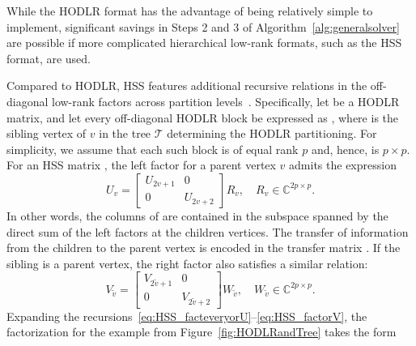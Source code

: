 \documentclass[final,reqno,onefignum,onetabnum]{siamart190516}
\begin{document}
While the HODLR format has the advantage of being relatively simple to implement, significant savings in Steps 2 and 3 of Algorithm~\ref{alg:generalsolver} are possible if  more complicated hierarchical low-rank formats, such as the HSS format, are used. 

Compared to HODLR, HSS features additional recursive relations in the off-diagonal low-rank factors across partition levels~\cite{bebendorf2008hierarchical,hackbusch2015hierarchical, martinsson2011fast}. 
Specifically, let   be a HODLR matrix, and let every off-diagonal HODLR block 
be expressed as , where  is the sibling vertex of $v$ in the tree $\mathcal T$ determining the HODLR partitioning. For simplicity, we assume that each such block is of equal rank $p$ and, hence,  is $p \times p$. 
For an HSS matrix , the left factor  for a parent vertex $v$ admits the expression
\begin{equation} 
\label{eq:HSS_facteveryorU}
U_v = \begin{bmatrix} U_{2v+1} & 0 \\ 0 & U_{2v+2} \end{bmatrix} R_v, \quad R_v \in \mathbb{C}^{2p \times p}.
\end{equation}
In other words, the columns of  are contained in the subspace spanned by the direct sum of the left factors at the children vertices.
The transfer of information from the children to the parent vertex is encoded in the transfer matrix . If the sibling  is a parent vertex, the right factor  also satisfies a similar relation:
\begin{equation} 
\label{eq:HSS_factorV}
V_{\tilde{v}} = \begin{bmatrix} V_{2\tilde v+1} & 0 \\ 0 & V_{2\tilde v+2} \end{bmatrix} W_{\tilde{v}}, \quad W_{\tilde{v}} \in \mathbb{C}^{2p \times p}.
\end{equation}
Expanding the recursions~\eqref{eq:HSS_facteveryorU}--\eqref{eq:HSS_factorV},
the factorization  for the example from Figure~\ref{fig:HODLRandTree} takes the form
\end{document}
